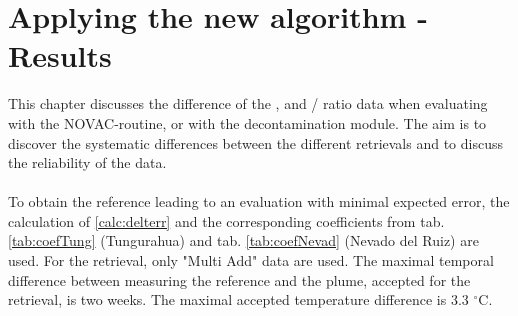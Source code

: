 \documentclass  [
  paper    = a4,
  BCOR     = 10mm,
  twoside,
  fontsize = 12pt,
  fleqn,
  toc      = bibnumbered,
  toc      = listofnumbered,
  numbers  = noendperiod,
  headings = normal,
  listof   = leveldown,
  version  = 3.03
]                                       {scrreprt}
\begin{document}
 \chapter{Applying the new algorithm -Results}
This chapter discusses the difference of the ,  and /  ratio data when evaluating with the NOVAC-routine, or with the decontamination module.
The aim is to discover the systematic differences between the different retrievals and to discuss the reliability of the data.\\
\\
To obtain the reference leading to an evaluation with minimal expected   error, the calculation of \cref{calc:delterr} and the corresponding coefficients from tab. \ref{tab:coefTung} (Tungurahua) and tab. \ref{tab:coefNevad} (Nevado del Ruiz) are used. 
For the retrieval, only "Multi Add" data are used. The maximal temporal difference between measuring the reference and the plume, accepted for the retrieval, is two weeks. The maximal accepted temperature difference is 3.3 $^{\circ}$C.\\
%
\end{document}
